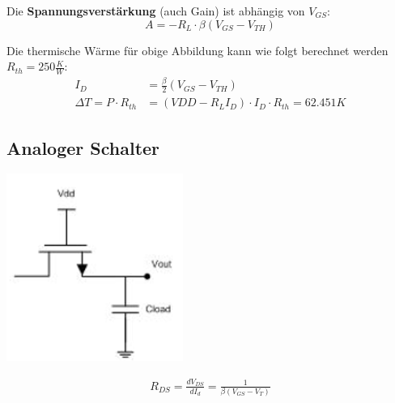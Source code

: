 \noindent Die \textbf{Spannungsverstärkung} (auch Gain) ist abhängig von $V_{GS}$:
\[
A = -R_L\cdot \beta(V_{GS} - V_{TH})
\]

Die thermische Wärme für obige Abbildung kann wie folgt berechnet werden $R_{th} = 250\frac{K}{W}$:
\begin{align*}
	I_D &= \frac{\beta}{2}(V_{GS}-V_{TH})\\
	\Delta T = P\cdot R_{th} &= (VDD - R_LI_D) \cdot I_D \cdot R_{th} = 62.451K
\end{align*}

\subsection{Analoger Schalter}
\begin{minipage}{0.20\textwidth}
\begin{center}
		\includegraphics[width=0.5\linewidth,keepaspectratio=true]{Images/analoger_schalter}
\end{center}
\end{minipage}%
\begin{minipage}{0.30\textwidth}
	\begin{align*}
		R_{DS} = \frac{dV_{DS}}{dI_d} = \frac{1}{\beta (V_{GS} - V_T)}
	\end{align*}
\end{minipage}